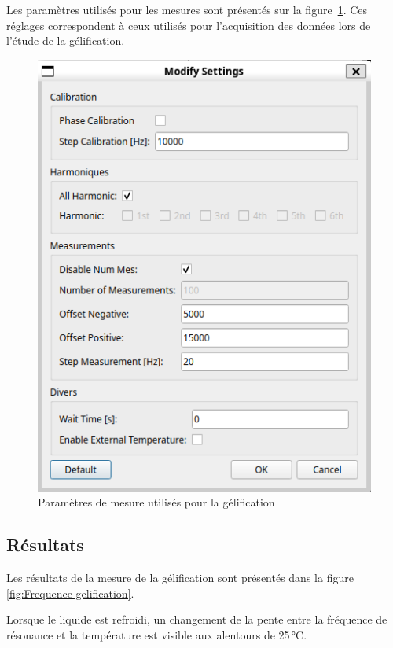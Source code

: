 Les paramètres utilisés pour les mesures sont présentés sur la figure~\ref{fig:SettingsGelification}. Ces réglages correspondent à ceux utilisés pour l'acquisition des données lors de l'étude de la gélification.

\begin{figure}[H]
    \centering
    \includegraphics[width=\textwidth]{assets/figures/SettingsWater-Ethanol.png}
    \caption{Paramètres de mesure utilisés pour la gélification}
    \label{fig:SettingsGelification}
\end{figure}

\subsection{Résultats}

Les résultats de la mesure de la gélification sont présentés dans la figure \ref{fig:Frequence gelification}. 

Lorsque le liquide est refroidi, un changement de la pente entre la fréquence de résonance et la température est visible aux alentours de 25 °C. 

